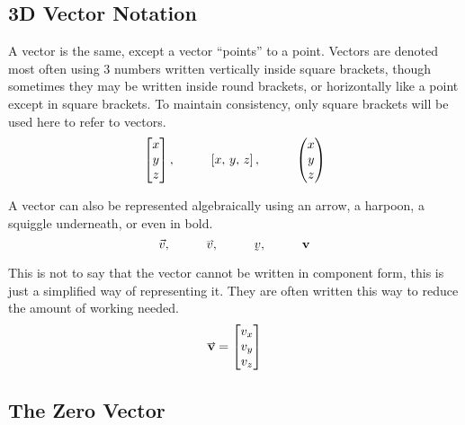 \documentclass[main.tex]{subfiles}
\begin{document}
            \subsection{3D Vector Notation}
                \label{subsec: 3D Vector Notation}

                A vector is the same, except a vector ``points'' to a point.
                Vectors are denoted most often using 3 numbers written vertically inside square brackets, though sometimes they may be written inside round brackets, or horizontally like a point except in square brackets. To maintain consistency, only square brackets will be used here to refer to vectors.
                \begin{equation*}
                    \Matrix{x\\y\\z}, \hspace{10mm} \left[x,\, y,\, z\right], \hspace{10mm} \left(\begin{matrix}
                        x\\y\\z
                    \end{matrix}\right)
                \end{equation*}
            
                A vector can also be represented algebraically using an arrow, a harpoon, a squiggle underneath, or even in bold.
                \begin{equation*}
                    \vec{v}, \hspace{10mm} \hvec{v}, \hspace{10mm} \svec{v}, \hspace{10mm} \bvec{v}
                \end{equation*}
                
                \newpage
                This is not to say that the vector cannot be written in component form, this is just a simplified way of representing it. They are often written this way to reduce the amount of working needed.
                \begin{equation*}
                    \vect{v} = \Matrix{v_x\\v_y\\v_z}
                \end{equation*}



            \subsection{The Zero Vector}
                \label{subsec: The Zero Vector}
\end{document}
